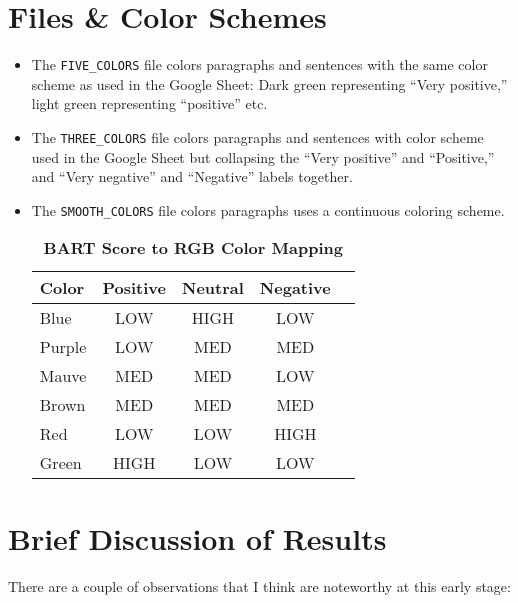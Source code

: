 \documentclass[11pt, letterpaper, twoside]{article}
\begin{document}
\section{Files \& Color Schemes}
\begin{itemize}
    \item The \texttt{FIVE\_COLORS} file colors paragraphs and sentences with the same color scheme as used in the Google Sheet: Dark green representing “Very positive,” light green representing “positive” etc.
    \item The \texttt{THREE\_COLORS} file colors paragraphs and sentences with color scheme used in the Google Sheet but collapsing the “Very positive” and “Positive,” and “Very negative” and “Negative” labels together.
    \item The \texttt{SMOOTH\_COLORS} file colors paragraphs uses a continuous coloring scheme.
    \begin{table}[h!]
        \caption{\textbf{BART Score to RGB Color Mapping}}
        \begin{tabular}[h!]{lcccl}
        \hline
        Color  & Positive & Neutral & Negative &  \\ \hline
        Blue   & LOW      & HIGH    & LOW      &  \\
        Purple & LOW      & MED     & MED      &  \\
        Mauve  & MED      & MED     & LOW      &  \\
        Brown  & MED      & MED     & MED      &  \\
        Red    & LOW      & LOW     & HIGH     &  \\
        Green  & HIGH     & LOW     & LOW      & 
        \end{tabular}
    \end{table}
\end{itemize}

\section{Brief Discussion of Results}
There are a couple of observations that I think are noteworthy at this early stage:\\
\end{document}
